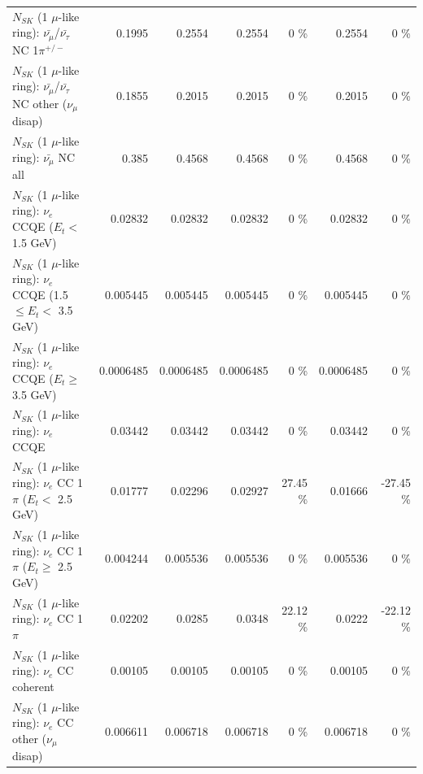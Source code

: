 \begin{table}
\begin{tabular}{| l | r | r | r  r | r  r |}
\hline
  $N_{SK}$ (1 $\mu$-like ring): $\bar{\nu_\mu}$/$\bar{\nu_\tau}$ NC 1$\pi^{+/-}$ &          0.1995 &          0.2554 &          0.2554 &        0 \%  &          0.2554 &        0 \%  \\ 
$N_{SK}$ (1 $\mu$-like ring): $\bar{\nu_\mu}$/$\bar{\nu_\tau}$ NC other ($\nu_\mu$ disap) &          0.1855 &          0.2015 &          0.2015 &        0 \%  &          0.2015 &        0 \%  \\ 
                          $N_{SK}$ (1 $\mu$-like ring): $\bar{\nu_{\mu}}$ NC all &           0.385 &          0.4568 &          0.4568 &        0 \%  &          0.4568 &        0 \%  \\ 
\hline
\hline
\hline
                  $N_{SK}$ (1 $\mu$-like ring): $\nu_e$ CCQE ($E_{t} <$ 1.5 GeV) &         0.02832 &         0.02832 &         0.02832 &        0 \%  &         0.02832 &        0 \%  \\ 
         $N_{SK}$ (1 $\mu$-like ring): $\nu_e$ CCQE (1.5 $\leq E_{t} <$ 3.5 GeV) &        0.005445 &        0.005445 &        0.005445 &        0 \%  &        0.005445 &        0 \%  \\ 
               $N_{SK}$ (1 $\mu$-like ring): $\nu_e$ CCQE ($E_{t} \geq$ 3.5 GeV) &       0.0006485 &       0.0006485 &       0.0006485 &        0 \%  &       0.0006485 &        0 \%  \\ 
\hline
                                      $N_{SK}$ (1 $\mu$-like ring): $\nu_e$ CCQE &         0.03442 &         0.03442 &         0.03442 &        0 \%  &         0.03442 &        0 \%  \\ 
\hline
             $N_{SK}$ (1 $\mu$-like ring): $\nu_e$ CC 1$\pi$ ($E_{t} <$ 2.5 GeV) &         0.01777 &         0.02296 &         0.02927 &    27.45 \%  &         0.01666 &   -27.45 \%  \\ 
          $N_{SK}$ (1 $\mu$-like ring): $\nu_e$ CC 1$\pi$ ($E_{t} \geq$ 2.5 GeV) &        0.004244 &        0.005536 &        0.005536 &        0 \%  &        0.005536 &        0 \%  \\ 
\hline
                                 $N_{SK}$ (1 $\mu$-like ring): $\nu_e$ CC 1$\pi$ &         0.02202 &          0.0285 &          0.0348 &    22.12 \%  &          0.0222 &   -22.12 \%  \\ 
                               $N_{SK}$ (1 $\mu$-like ring): $\nu_e$ CC coherent &         0.00105 &         0.00105 &         0.00105 &        0 \%  &         0.00105 &        0 \%  \\ 
                $N_{SK}$ (1 $\mu$-like ring): $\nu_e$ CC other ($\nu_\mu$ disap) &        0.006611 &        0.006718 &        0.006718 &        0 \%  &        0.006718 &        0 \%  \\ 

\end{tabular}
\end{table}
